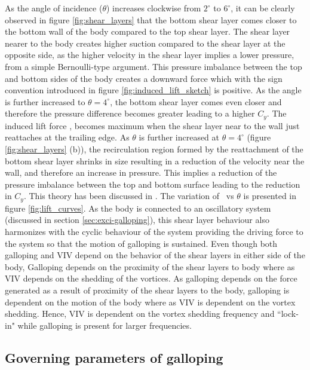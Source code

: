 As the angle of incidence ($\theta$) increases clockwise from $2^{\circ}$ to $6^{\circ}$, it can be clearly observed in figure \ref{fig:shear_layers} that the bottom shear layer comes closer to the bottom wall of the body compared to the top shear layer. The shear layer nearer to the body creates higher suction compared to the shear layer at the opposite side, as the higher velocity in the shear layer implies a lower pressure, from a simple Bernoulli-type argument. This pressure imbalance between the top and bottom sides of the body creates a downward force which with the sign convention introduced in figure \ref{fig:induced_lift_sketch} is positive. As the angle is further increased to $\theta=4^{\circ}$, the bottom shear layer comes even closer and therefore the pressure difference becomes greater leading to a higher $C_{y}$. The induced lift force \cy, becomes maximum when the shear layer near to the wall just reattaches at the trailing edge. As $\theta$ is further increased at  $\theta=4^{\circ}$ (figure \ref{fig:shear_layers} (b)), the recirculation region formed by the reattachment of the bottom shear layer shrinks in size resulting in a reduction of the velocity near the wall, and therefore an increase in pressure. This implies a reduction of the pressure imbalance between the top and bottom surface leading to the reduction in $C_{y}$. This theory has been discussed in \citet{Parkinson1989}. The variation of \cy\ vs $\theta$ is presented in figure \ref{fig:lift_curves}. As the body is connected to an oscillatory system (discussed in section \ref{sec:exci-galloping}), this shear layer behaviour also harmonizes with the cyclic behaviour of the system providing the driving force to the system so that the motion of galloping is sustained. Even though both galloping and VIV depend on the behavior of the shear layers in either side of the body, Galloping depends on the proximity of the shear layers to body where as VIV depends on the shedding of the vortices. As galloping depends on the force generated as a result of proximity of the shear layers to the body, galloping is dependent on the motion of the body where as VIV is dependent on the vortex shedding. Hence, VIV is dependent on the vortex shedding frequency and ``lock-in" while galloping is present for larger frequencies. 


\subsection{Governing parameters of galloping}

